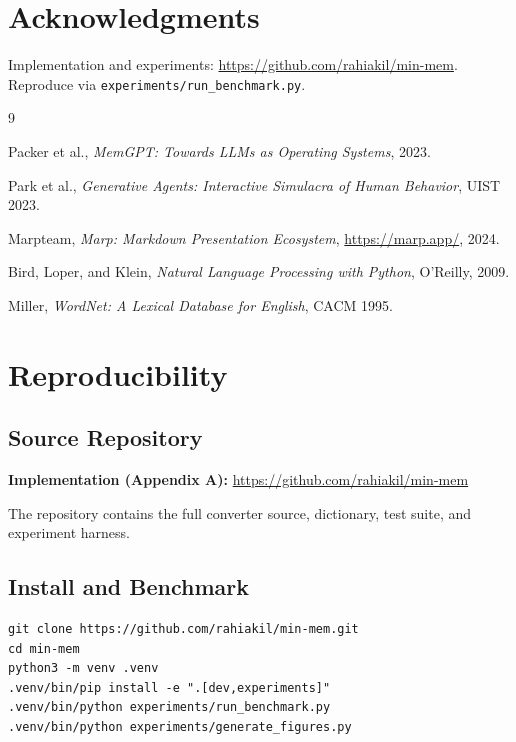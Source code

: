 \documentclass[10pt,twocolumn]{article}
\begin{document}
\section*{Acknowledgments}

Implementation and experiments: \url{https://github.com/rahiakil/min-mem}. Reproduce via \texttt{experiments/run\_benchmark.py}.

\begin{thebibliography}{9}

Packer et al.,
\textit{MemGPT: Towards LLMs as Operating Systems},
2023.

Park et al.,
\textit{Generative Agents: Interactive Simulacra of Human Behavior},
UIST 2023.

Marpteam,
\textit{Marp: Markdown Presentation Ecosystem},
\url{https://marp.app/}, 2024.

Bird, Loper, and Klein,
\textit{Natural Language Processing with Python},
O'Reilly, 2009.

Miller,
\textit{WordNet: A Lexical Database for English},
CACM 1995.

\end{thebibliography}

\onecolumn
\appendix
\section{Reproducibility}
\label{appendix}

\subsection{Source Repository}

\textbf{Implementation (Appendix A):} \url{https://github.com/rahiakil/min-mem}

The repository contains the full converter source, dictionary, test suite, and experiment harness.

\subsection{Install and Benchmark}

\begin{verbatim}
git clone https://github.com/rahiakil/min-mem.git
cd min-mem
python3 -m venv .venv
.venv/bin/pip install -e ".[dev,experiments]"
.venv/bin/python experiments/run_benchmark.py
.venv/bin/python experiments/generate_figures.py
\end{verbatim}
\end{document}
